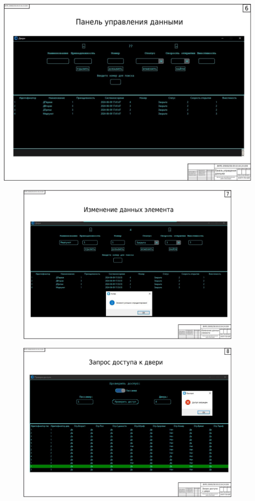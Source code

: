 \begin{landscape}
\begin{плакат}
	\includegraphics[width=0.82\linewidth]{images/плакат6}
	\label{fig:6}
\end{плакат}

\begin{figure}
	\includegraphics[width=0.82\linewidth]{images/плакат7}
	\label{fig:7}
\end{figure}

\begin{figure}
	\includegraphics[width=0.82\linewidth]{images/плакат8}
	\label{fig:8}
\end{figure}


\end{landscape}
